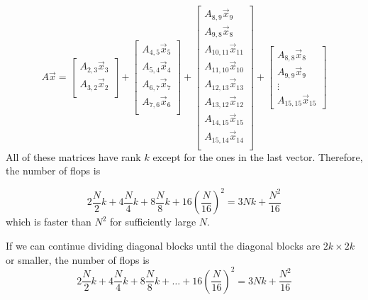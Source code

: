 \begin{equation*}
    A\vec{x} =
    \begin{bmatrix}
        A_{2,3}\vec{x}_3\\
        A_{3,2}\vec{x}_2\\
    \end{bmatrix}
    +
    \begin{bmatrix}
        A_{4,5}\vec{x}_5\\
        A_{5,4}\vec{x}_4\\
        A_{6,7}\vec{x}_7\\
        A_{7,6}\vec{x}_6\\
    \end{bmatrix}
    +
    \begin{bmatrix}
        A_{8,9}\vec{x}_9\\
        A_{9, 8}\vec{x}_8\\
        A_{10, 11}\vec{x}_{11}\\
        A_{11, 10}\vec{x}_{10}\\
        A_{12, 13}\vec{x}_{13}\\
        A_{13, 12}\vec{x}_{12}\\
        A_{14, 15}\vec{x}_{15}\\
        A_{15, 14}\vec{x}_{14}\\
    \end{bmatrix}
    +
    \begin{bmatrix}
        A_{8, 8} \vec{x}_8\\
        A_{9, 9} \vec{x}_9\\
        \vdots\\
        A_{15, 15} \vec{x}_{15}
    \end{bmatrix}
\end{equation*}
All of these matrices have rank $k$ except for the ones in the last vector. Therefore, the number of flops is

\begin{equation*}
    2 \frac{N}{2} k +
    4 \frac{N}{4} k +
    8 \frac{N}{8} k +
    16 \left(\frac{N}{16} \right)^2 =
    3Nk+\frac{N^2}{16}
\end{equation*}
which is faster than $N^2$ for sufficiently large $N$.

If we can continue dividing diagonal blocks until the diagonal blocks are $2k\times 2k$ or smaller, the number of flops is
\begin{equation*}
    2 \frac{N}{2} k +
    4 \frac{N}{4} k +
    8 \frac{N}{8} k + \ldots +
    16 \left(\frac{N}{16} \right)^2 =
    3Nk+\frac{N^2}{16}
\end{equation*}


